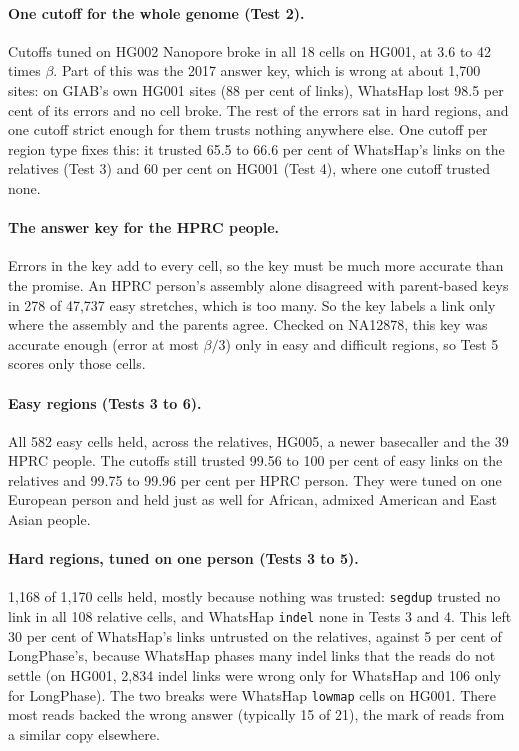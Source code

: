 \documentclass[11pt]{article}
\newcommand{\grp}[1]{\texttt{#1}}
\begin{document}
\paragraph{One cutoff for the whole genome (Test 2).} Cutoffs tuned on HG002
Nanopore broke in all 18 cells on HG001, at 3.6 to 42 times $\beta$. Part of
this was the 2017 answer key, which is wrong at about 1{,}700 sites: on
GIAB's own HG001 sites (88 per cent of links), WhatsHap lost 98.5 per cent
of its errors and no cell broke. The rest of the errors sat in hard regions,
and one cutoff strict enough for them trusts nothing anywhere else. One
cutoff per region type fixes this: it trusted 65.5 to 66.6 per cent of
WhatsHap's links on the relatives (Test 3) and 60 per cent on HG001 (Test
4), where one cutoff trusted none.

\paragraph{The answer key for the HPRC people.} Errors in the key add to
every cell, so the key must be much more accurate than the promise. An HPRC
person's assembly alone disagreed with parent-based keys in 278 of 47{,}737
easy stretches, which is too many. So the key labels a link only where the
assembly and the parents agree. Checked on NA12878, this key was accurate
enough (error at most $\beta/3$) only in easy and difficult regions, so Test
5 scores only those cells.

\paragraph{Easy regions (Tests 3 to 6).} All 582 easy cells held, across the
relatives, HG005, a newer basecaller and the 39 HPRC people. The cutoffs
still trusted 99.56 to 100 per cent of easy links on the relatives and 99.75
to 99.96 per cent per HPRC person. They were tuned on one European person
and held just as well for African, admixed American and East Asian people.

\paragraph{Hard regions, tuned on one person (Tests 3 to 5).} 1{,}168 of
1{,}170 cells held, mostly because nothing was trusted: \grp{segdup} trusted
no link in all 108 relative cells, and WhatsHap \grp{indel} none in Tests 3
and 4. This left 30 per cent of WhatsHap's links untrusted on the relatives,
against 5 per cent of LongPhase's, because WhatsHap phases many indel links
that the reads do not settle (on HG001, 2{,}834 indel links were wrong only
for WhatsHap and 106 only for LongPhase). The two breaks were WhatsHap
\grp{lowmap} cells on HG001. There most reads backed the wrong answer
(typically 15 of 21), the mark of reads from a similar copy elsewhere.
\end{document}
